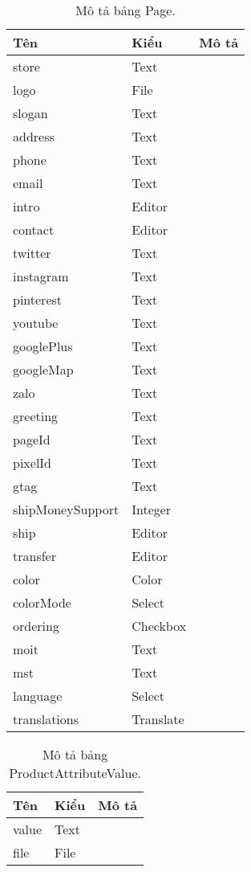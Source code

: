 \begin{table}[h!]
\begin{center}
\begin{tabular}{ |l|l|l| } 
	\hline
	Tên & Kiểu & Mô tả \\
	\hline
	store & Text & \dotfill \\
logo & File & \dotfill \\
slogan & Text & \dotfill \\
address & Text & \dotfill \\
phone & Text & \dotfill \\
email & Text & \dotfill \\
intro & Editor & \dotfill \\
contact & Editor & \dotfill \\
twitter & Text & \dotfill \\
instagram & Text & \dotfill \\
pinterest & Text & \dotfill \\
youtube & Text & \dotfill \\
googlePlus & Text & \dotfill \\
googleMap & Text & \dotfill \\
zalo & Text & \dotfill \\
greeting & Text & \dotfill \\
pageId & Text & \dotfill \\
pixelId & Text & \dotfill \\
gtag & Text & \dotfill \\
shipMoneySupport & Integer & \dotfill \\
ship & Editor & \dotfill \\
transfer & Editor & \dotfill \\
color & Color & \dotfill \\
colorMode & Select & \dotfill \\
ordering & Checkbox & \dotfill \\
moit & Text & \dotfill \\
mst & Text & \dotfill \\
language & Select & \dotfill \\
translations & Translate & \dotfill \\ 
	\hline
\end{tabular}
	\caption{Mô tả bảng Page.}
	\label{table:Page}
\end{center}
\end{table}


\begin{table}[h!]
\begin{center}
\begin{tabular}{ |l|l|l| } 
	\hline
	Tên & Kiểu & Mô tả \\
	\hline
	value & Text & \dotfill \\
file & File & \dotfill \\ 
	\hline
\end{tabular}
	\caption{Mô tả bảng ProductAttributeValue.}
	\label{table:ProductAttributeValue}
\end{center}
\end{table}


